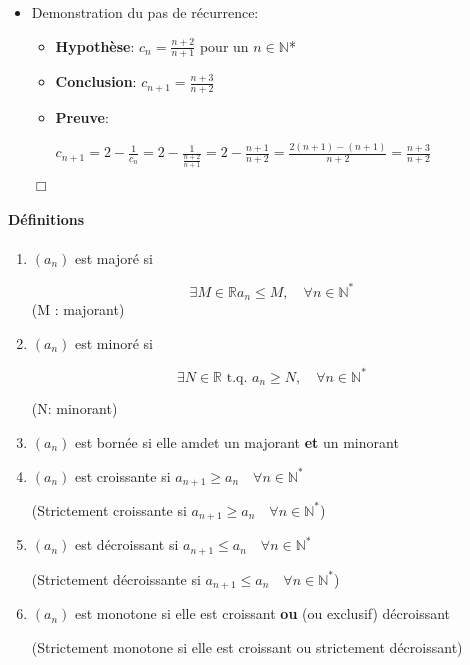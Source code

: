 \documentclass[
    11pt,
    a4paper,
    oneside,
    headinlcude, footinclude,
    twoside,
]{report}
\newcommand{\tq}[0]{\textrm{ t.q. }}
\newcommand{\cqfd}[0]{\begin{flushright}$\Box$\end{flushright}}
\begin{document}
\begin{enumerate}[1)]
\begin{itemize}
\item Demonstration du pas de récurrence:
\begin{itemize}
\item \textbf{Hypothèse}:  $c _{n} = \frac{n+2}{n+1}$ pour
un $n \in \mathbb{N}$*

\item \textbf{Conclusion}: $c _{n+1} = \frac{n+3}{n+2}$

\item \textbf{Preuve}: 

$c _{n+1} = 2 - \frac{1}{c _{n}} = 2 - \frac{1}{\frac{n+2}{n+1}}
= 2 - \frac{n+1}{n+2} = \frac{2(n+1)-(n+1)}{n+2} =
\frac{n+3}{n+2}$
\end{itemize}
\cqfd
\end{itemize}
\end{enumerate}

\paragraph{Définitions}
\label{par:definitions}

\begin{enumerate}
\item $(a _{n})$ est majoré si

$$ \exists M \in \mathbb{R}  a_{n} \leq M, \quad \forall n \in
\mathbb{N}^{\ast} $$
(M : majorant)
\item $(a _{n})$ est minoré si 

$$\exists N \in \mathbb{R} \tq a _{n} \geq N, \quad \forall n \in
\mathbb{N} ^{\ast} $$

(N: minorant)

\item $(a_{n})$ est bornée si elle amdet un majorant \textbf{et} un
minorant

\item $(a_{n})$ est croissante si $a_{n+1} \geq a_{n} \quad \forall n \in \mathbb{N} ^{\ast}$

(Strictement croissante si $a_{n+1} \geq a_{n} \quad \forall n \in \mathbb{N} ^{\ast}$)

\item $(a_{n})$ est décroissant si $a_{n+1} \leq a_{n} \quad \forall n \in \mathbb{N} ^{\ast}$

(Strictement décroissante si $a_{n+1} \leq a_{n} \quad \forall n \in \mathbb{N} ^{\ast}$)

\item $(a_{n})$ est monotone si elle est croissant \textbf{ou} (ou exclusif) décroissant

(Strictement monotone si elle est croissant ou strictement décroissant)
\end{enumerate}
\end{document}
